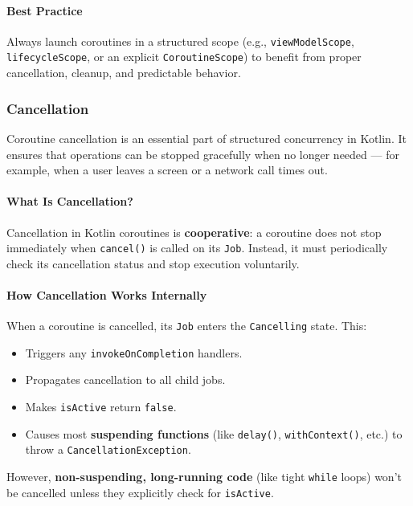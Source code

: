 \documentclass[a4paper,12pt]{article}
\begin{document}
\paragraph{Best Practice}
Always launch coroutines in a structured scope (e.g., \texttt{viewModelScope}, \texttt{lifecycleScope}, or an explicit \texttt{CoroutineScope}) to benefit from proper cancellation, cleanup, and predictable behavior.

\subsubsection{Cancellation}

Coroutine cancellation is an essential part of structured concurrency in Kotlin. It ensures that operations can be stopped gracefully when no longer needed — for example, when a user leaves a screen or a network call times out.

\paragraph{What Is Cancellation?}

Cancellation in Kotlin coroutines is \textbf{cooperative}: a coroutine does not stop immediately when \texttt{cancel()} is called on its \texttt{Job}. Instead, it must periodically check its cancellation status and stop execution voluntarily.

\paragraph{How Cancellation Works Internally}

When a coroutine is cancelled, its \texttt{Job} enters the \texttt{Cancelling} state. This:

\begin{itemize}
  \item Triggers any \texttt{invokeOnCompletion} handlers.
  \item Propagates cancellation to all child jobs.
  \item Makes \texttt{isActive} return \texttt{false}.
  \item Causes most \textbf{suspending functions} (like \texttt{delay()}, \texttt{withContext()}, etc.) to throw a \texttt{CancellationException}.
\end{itemize}

However, \textbf{non-suspending, long-running code} (like tight \texttt{while} loops) won’t be cancelled unless they explicitly check for \texttt{isActive}.
\end{document}
